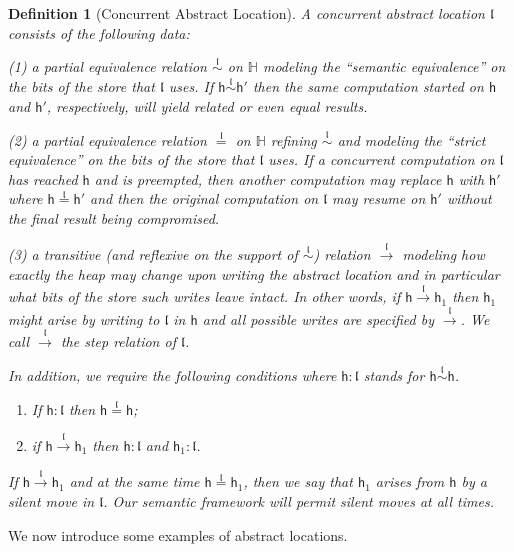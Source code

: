 \documentclass[nocopyrightspace,preprint]{sigplanconf}
\newcommand{\Stores}{\ensuremath{\mathbb{H}}}
\newtheorem{definition}[theorem]{Definition}
\newcommand{\loc}{\mathfrak{l}}
\newcommand\heap{\ensuremath{\mathsf{h}}\xspace}
\newcommand\h{\heap}
\newcommand\inR[2]{\ensuremath{#1:#2}}
\newcommand\rloc[3]{\ensuremath{#1 \stackrel{#3}{\sim} #2}}
\newcommand\rrloc[3]{\ensuremath{#1 \stackrel{#3}{=} #2}}
\newcommand\gloc[3]{\ensuremath{#1 \xrightarrow{#3}#2}}
\begin{document}
\begin{definition}[Concurrent Abstract Location]\label{absloc}
  A \emph{concurrent abstract location} $\loc$ consists of the following data:

(1) a partial equivalence relation  $\rloc{}{}{\loc}$ on
  $\Stores$ modeling the ``semantic equivalence'' on the bits of the
  store that $\loc$ uses.
If $\heap\rloc{}{}{\loc}\heap'$ then the same computation started on $\heap$ and $\heap'$, respectively, will yield related or even equal results.
 
(2) a partial equivalence relation  $\rrloc{}{}{\loc}$ on
  $\Stores$ refining $\rloc{}{}{\loc}$ and modeling the ``strict equivalence'' on the bits of the
  store that $\loc$ uses. 
If a concurrent computation on $\loc$ has reached $\heap$ and is preempted, then another computation may replace $\heap$ with $\heap'$ where $\heap\rrloc{}{}{\loc}\heap'$ and then the original computation on $\loc$ may resume on $\heap'$ without the final result being compromised. 

(3) a transitive  (and reflexive on the support of $\rloc{}{}{\loc}$) 
 relation $\gloc{}{}{\loc}$ modeling how exactly the
  heap may change upon writing the abstract location and in particular
  what bits of the store such writes leave intact. In other words, if
  $\gloc{\heap}{\heap_1}{\loc}$ then $\heap_1$ might arise by writing
  to $\loc$ in $\heap$ and all possible writes are specified by
  $\gloc{}{}{\loc}$. We call $\gloc{}{}{\loc}$ the \emph{step relation} of $\loc$. 

In addition, we require the following 
conditions where $\inR{\heap}{\loc}$ stands for $\rloc{\heap}{\heap}{\loc}$.
\begin{enumerate}
  \item If $\inR{\heap}{\loc}$ then $\rrloc{\heap}{\heap}{\loc}$;
  \item if $\gloc{\heap}{\heap_1}{\loc}$ then $\inR{\heap}{\loc}$ and $\inR{\heap_1}{\loc}$.
\end{enumerate}
If $\gloc{\h}{\h_1}{\loc}$ and at the same time
$\rrloc{\h}{\h_1}{\loc}$, then we say that $\h_1$ arises from $\h$ by a \emph{silent move} in $\loc$. Our semantic framework will permit silent
moves at all times.
\end{definition}
We now introduce some examples of abstract locations. 


\label{sec:abs-examples}
\end{document}
